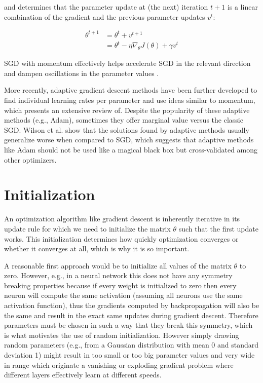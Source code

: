 and determines that the parameter update at (the next) iteration $t+1$ is a linear combination of the gradient and the previous parameter updates $v^{t}$:

\begin{align*}
    \theta^{t+1} &= \theta^{t} + v^{t+1} \\
                 &= \theta^{t} - \eta \nabla_{\theta} J(\theta) + \gamma v^{t}
\end{align*}

\ac{SGD} with momentum effectively helps accelerate \ac{SGD} in the relevant direction and dampen oscillations in the parameter values \cite{ruder2016}.

More recently, adaptive gradient descent methods have been further developed to find individual learning rates per parameter and use ideas similar to momentum, which \citeauthor{ruder2016} \cite{ruder2016} presents an extensive review of. Despite the popularity of these adaptive methods (e.g., Adam), sometimes they offer marginal value versus the classic \ac{SGD}. Wilson et al. \cite{wilson2017} show that the solutions found by adaptive methods usually generalize worse when compared to \ac{SGD}, which suggests that adaptive methods like Adam should not be used like a magical black box but cross-validated among other optimizers.

\section{Initialization}

An optimization algorithm like gradient descent is inherently iterative in its update rule for which we need to initialize the matrix $\theta$ such that the first update works. This initialization determines how quickly optimization converges or whether it converges at all, which is why it is so important.

A reasonable first approach would be to initialize all values of the matrix $\theta$ to zero. However, e.g., in a neural network this does not have any symmetry breaking properties because if every weight is initialized to zero then every neuron will compute the same activation (assuming all neurons use the same activation function), thus the gradients computed by backpropagation will also be the same and result in the exact same updates during gradient descent. Therefore parameters must be chosen in such a way that they break this symmetry, which is what motivates the use of random initialization. However simply drawing random parameters (e.g., from a Gaussian distribution with mean 0 and standard deviation 1) might result in too small or too big parameter values and very wide in range which originate a vanishing or exploding gradient problem where different layers effectively learn at different speeds.


